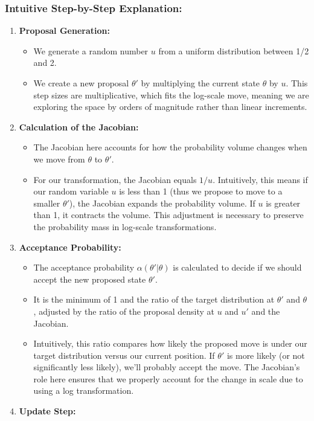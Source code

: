 \documentclass[10pt]{article}
\begin{document}
\subsubsection*{Intuitive Step-by-Step Explanation:}
\begin{enumerate}
  \item \textbf{Proposal Generation:}

  \begin{itemize}
    \item We generate a random number \( u \) from a uniform distribution between 1/2 and 2.
    \item We create a new proposal \( \theta' \) by multiplying the current state \( \theta \) by \( u \). This step sizes are multiplicative, which fits the log-scale move, meaning we are exploring the space by orders of magnitude rather than linear increments.
  \end{itemize}
  \item \textbf{Calculation of the Jacobian:}

  \begin{itemize}
    \item The Jacobian here accounts for how the probability volume changes when we move from \( \theta \) to \( \theta' \).
    \item For our transformation, the Jacobian equals \( 1/u \). Intuitively, this means if our random variable \( u \) is less than 1 (thus we propose to move to a smaller \( \theta' \)), the Jacobian expands the probability volume. If \( u \) is greater than 1, it contracts the volume. This adjustment is necessary to preserve the probability mass in log-scale transformations.
  \end{itemize}
  \item \textbf{Acceptance Probability:}

  \begin{itemize}
    \item The acceptance probability \( \alpha(\theta'|\theta) \) is calculated to decide if we should accept the new proposed state \( \theta' \).
    \item It is the minimum of 1 and the ratio of the target distribution at \( \theta' \) and \( \theta \), adjusted by the ratio of the proposal density at \( u \) and \( u' \) and the Jacobian.
    \item Intuitively, this ratio compares how likely the proposed move is under our target distribution versus our current position. If \( \theta' \) is more likely (or not significantly less likely), we'll probably accept the move. The Jacobian's role here ensures that we properly account for the change in scale due to using a log transformation.
  \end{itemize}
  \item \textbf{Update Step:}


\end{enumerate}
\end{document}

